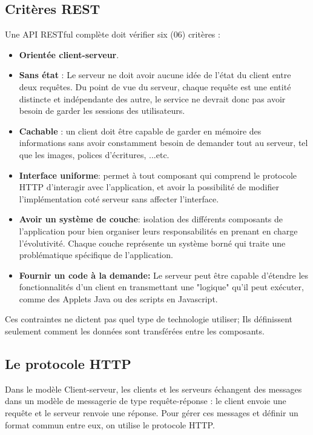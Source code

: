 			\subsection{Critères REST}
			Une API RESTful complète doit vérifier six (06) critères :
\begin{itemize}
\item \textbf{Orientée client-serveur}.

\item \textbf{Sans état} : Le serveur ne doit avoir aucune idée de l'état du client entre deux requêtes. Du point de vue du serveur, chaque requête est une entité distincte et indépendante des autre,  le service ne devrait donc pas avoir besoin de garder les sessions des utilisateurs.

\item \textbf{Cachable} : un client doit être capable de garder en mémoire des informations sans avoir constamment besoin de demander tout au serveur, tel que les images, polices d'écritures, ...etc.

\item \textbf{Interface uniforme}: permet à tout composant qui comprend le protocole HTTP d'interagir avec l'application, et avoir la possibilité de modifier l'implémentation coté serveur sans affecter l'interface.

\item \textbf{Avoir un système de couche}: isolation des différents composants de l'application pour bien organiser leurs responsabilités en prenant en charge l'évolutivité. Chaque couche représente un système borné qui traite une problématique spécifique de l'application.

\item \textbf{Fournir un code à la demande: }  Le serveur peut être capable d'étendre les fonctionnalités d'un client en transmettant une "logique" qu'il peut exécuter, comme des Applets Java ou des scripts en Javascript.

\end{itemize}
Ces contraintes ne dictent pas quel type de technologie utiliser; Ils définissent seulement comment les données sont transférées entre les composants.
			\subsection{Le protocole HTTP}
			Dans le modèle Client-serveur, les clients et les serveurs échangent des messages dans un modèle de messagerie de type requête-réponse : le client envoie une requête et le serveur renvoie une réponse.
Pour gérer ces messages et définir un format commun entre eux, on utilise le protocole HTTP.

